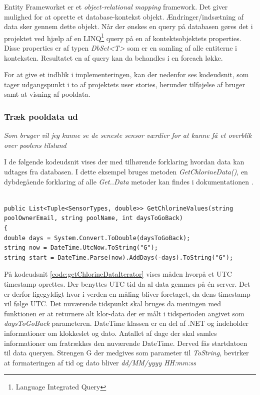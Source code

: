 Entity Frameworket er et \textit{object-relational mapping} framework. Det giver mulighed for at oprette et database-kontekst objekt. Ændringer/indsætning af data sker gennem dette objekt. Når der ønskes en query på databasen gøres det i projektet ved hjælp af en LINQ\footnote{Language Integrated Query} query på en af kontektsobjektets properties. Disse properties er af typen \textit{DbSet<T>} som er en samling af alle entiterne i konteksten. Resultatet en af query kan da behandles i en foreach løkke.

For at give et indblik i implementeringen, kan der nedenfor ses kodeudsnit, som tager udgangspunkt i to af projektets user stories, herunder tilføjelse af bruger samt at visning af pooldata.

\subsubsection{Træk pooldata ud}

\textit{Som bruger vil jeg kunne se de seneste sensor værdier for at kunne få et overblik over poolens tilstand}\

I de følgende kodeudsnit vises der med tilhørende forklaring hvordan data kan udtages fra databasen. I dette eksempel bruges metoden \textit{GetChlorineData()}, en dybdegående forklaring af alle \textit{Get..Data} metoder kan findes i dokumentationen .

\begin{lstlisting}[caption= GetChlorineData method - konvertering af DateTime objekter, label=code:getChlorineData]

public List<Tuple<SensorTypes, double>> GetChlorineValues(string poolOwnerEmail, string poolName, int daysToGoBack)
{
double days = System.Convert.ToDouble(daysToGoBack);
string now = DateTime.UtcNow.ToString("G");
string start = DateTime.Parse(now).AddDays(-days).ToString("G");
\end{lstlisting}

På kodeudsnit \ref{code:getChlorineDataIterator} vises måden hvorpå et UTC timestamp oprettes. Der benyttes UTC tid da al data gemmes på én server. Det er derfor ligegyldigt hvor i verden en måling bliver foretaget, da dens timestamp vil følge UTC. Det nuværende tidspunkt skal bruges da meningen med funktionen er at returnere alt klor-data der er målt i tidsperioden angivet som \textit{daysToGoBack} parameteren. DateTime \cite{dotnetdatetime} klassen er en del af .NET og indeholder informationer om klokkeslet og dato. Antallet af dage der skal samles informationer om fratrækkes den nuværende DateTime. Derved fås startdatoen til data queryen. Strengen G der medgives som parameter til \textit{ToString}, bevirker at formateringen af tid og dato bliver \textit{dd/MM/yyyy HH:mm:ss}

